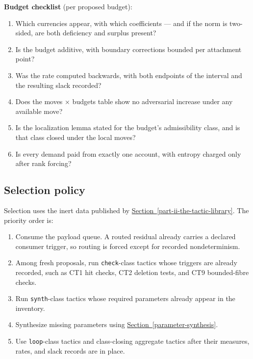 \documentclass[
  11pt,
]{article}
\providecommand{\tightlist}{%
  \setlength{\itemsep}{0pt}\setlength{\parskip}{0pt}}
\theoremstyle{definition}
\newcommand{\secref}[1]{\hyperref[#1]{Section~\ref*{#1}}}
\begin{document}
\textbf{Budget checklist} (per proposed budget):

\begin{enumerate}
\def\labelenumi{\arabic{enumi}.}
\tightlist
\item
  Which currencies appear, with which coefficients --- and if the norm
  is two-sided, are both deficiency and surplus present?
\item
  Is the budget additive, with boundary corrections bounded per
  attachment point?
\item
  Was the rate computed backwards, with both endpoints of the interval
  and the resulting slack recorded?
\item
  Does the moves × budgets table show no adversarial increase under any
  available move?
\item
  Is the localization lemma stated for the budget's admissibility class,
  and is that class closed under the local moves?
\item
  Is every demand paid from exactly one account, with entropy charged
  only after rank forcing?
\end{enumerate}

\subsection{Selection policy}\label{selection-policy}

Selection uses the inert data published by \secref{part-ii-the-tactic-library}. The priority order
is:

\begin{enumerate}
\def\labelenumi{\arabic{enumi}.}
\tightlist
\item
  Consume the payload queue. A routed residual already carries a declared
  consumer trigger, so routing is forced except for recorded
  nondeterminism.
\item
  Among fresh proposals, run \texttt{check}-class tactics whose triggers
  are already recorded, such as CT1 hit checks, CT2 deletion tests, and
  CT9 bounded-fibre checks.
\item
  Run \texttt{synth}-class tactics whose required parameters already
  appear in the inventory.
\item
  Synthesize missing parameters using \secref{parameter-synthesis}.
\item
  Use \texttt{loop}-class tactics and class-closing aggregate tactics
  after their measures, rates, and slack records are in place.
\end{enumerate}
\end{document}
